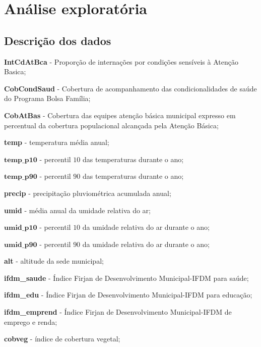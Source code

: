 \documentclass[12pt,a4paper]{article}\usepackage[]{graphicx}\usepackage[]{color}
\begin{document}



\tableofcontents  %




\newpage
\section{{\LARGE\textbf{Análise exploratória}}}


\subsection{\textbf{Descrição dos dados}}

\textbf{IntCdAtBca} - Proporção de internações por condições sensíveis à Atenção Basica;

\noindent
\textbf{CobCondSaud} - Cobertura de acompanhamento das condicionalidades de saúde do Programa Bolsa Família;

\noindent
\textbf{CobAtBas} - Cobertura das equipes atenção básica municipal expresso em percentual da cobertura populacional alcançada pela Atenção Básica;

\noindent
\textbf{temp} - temperatura média anual;

\noindent
$\mathbf{temp\_p10}$ - percentil $10$ das temperaturas durante o ano;

\noindent
$\mathbf{temp\_p90}$ - percentil $90$ das temperaturas durante o ano;

\noindent
\textbf{precip} - precipitação pluviométrica acumulada anual;

\noindent
\textbf{umid} - média anual da umidade relativa do ar;

\noindent
$\mathbf{umid\_p10}$ - percentil $10$ da umidade relativa do ar durante o ano;

\noindent
$\mathbf{umid\_p90}$ - percentil $90$ da umidade relativa do ar durante o ano;

\noindent
\textbf{alt} - altitude da sede municipal;

\noindent
\textbf{ifdm\_saude} - Índice Firjan de Desenvolvimento Municipal-IFDM para saúde;

\noindent
\textbf{ifdm\_edu} - Índice Firjan de Desenvolvimento Municipal-IFDM para educação;

\noindent
\textbf{ifdm\_emprend} - Índice Firjan de Desenvolvimento Municipal-IFDM de emprego e renda;

\noindent
\textbf{cobveg} - índice de cobertura vegetal;
\end{document}
